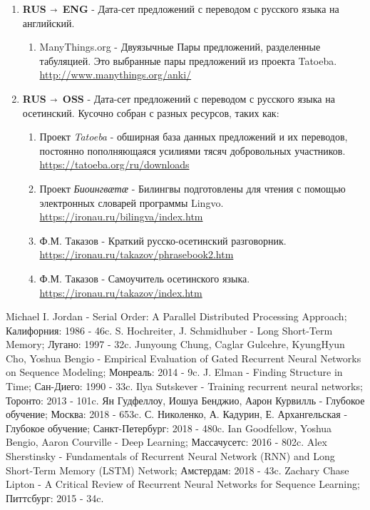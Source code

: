 	\begin{enumerate}
		\item \textbf{RUS $\shortrightarrow$ ENG} - Дата-сет предложений с переводом с русского языка на английский.
		\begin{enumerate}
			\item ManyThings.org - Двуязычные Пары предложений, разделенные табуляцией. 
			Это выбранные пары предложений из проекта Tatoeba. \\ 
			\url{http://www.manythings.org/anki/}
		\end{enumerate}
		\item \textbf{RUS $\shortrightarrow$ OSS} - Дата-сет предложений с переводом с русского языка на осетинский.
		Кусочно собран с разных ресурсов, таких как:
		\begin{enumerate}
			 \item Проект \textit{Tatoeba} - обширная база данных предложений и их переводов, постоянно пополняющаяся усилиями тясяч добровольных участников. \\ \url{https://tatoeba.org/ru/downloads}
			 \item Проект \textit{Биоингвӕтӕ} - Билингвы подготовлены для чтения с помощью электронных словарей программы Lingvo. \\ \url{https://ironau.ru/bilingva/index.htm}
			 \item Ф.М. Таказов - Краткий русско-осетинский разговорник. \\ \url{https://ironau.ru/takazov/phrasebook2.htm}
			 \item Ф.М. Таказов - Самоучитель осетинского языка. \\ \url{https://ironau.ru/takazov/index.htm}
 		\end{enumerate}
	\end{enumerate}

    \newpage

	
	\begin{thebibliography}{}
		  Michael I. Jordan	-	Serial Order: A Parallel Distributed Processing Approach; Калифорния: 1986 - 46c. 
		  S. Hochreiter, J. Schmidhuber	-	Long Short-Term Memory; Лугано: 1997 - 32c.
		  Junyoung Chung, Caglar Gulcehre, KyungHyun Cho, Yoshua Bengio	-	Empirical Evaluation of Gated Recurrent Neural Networks on Sequence Modeling; Монреаль: 2014 - 9c.
		 J. Elman	-	Finding Structure in Time; Сан-Диего:  1990 - 33c.
		 Ilya Sutskever	-	Training recurrent neural networks; Торонто: 2013 - 101c.
		 Ян Гудфеллоу, Иошуа Бенджио, Аарон Курвилль	-	Глубокое обучение; Москва: 2018 - 653c. 
		 С. Николенко, А. Кадурин, Е. Архангельская	-	Глубокое обучение;  Санкт-Петербург: 2018 - 480c.
		 Ian Goodfellow, Yoshua Bengio, Aaron Courville	-	Deep Learning; Массачусетс: 2016 - 802c.
		 Alex Sherstinsky	-	Fundamentals of Recurrent Neural Network (RNN) and Long Short-Term Memory (LSTM) Network; Амстердам: 2018 - 43c.
		 Zachary Chase Lipton	-	A Critical Review of Recurrent Neural Networks for Sequence Learning; Питтсбург: 2015 - 34c.
	\end{thebibliography}

